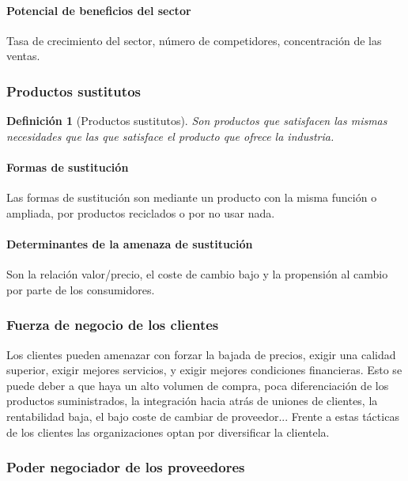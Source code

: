 \documentclass[12pt]{article}
\theoremstyle{definition_wo_parentheses}
\newtheorem{definicion}{Definición}[section]
\begin{document}
\paragraph{Potencial de beneficios del sector} Tasa de crecimiento del sector, número de competidores, concentración de las ventas.

\subsubsection{Productos sustitutos}

\begin{definicion}[Productos sustitutos]
Son productos que satisfacen las mismas necesidades que las que satisface el producto que ofrece la industria.
\end{definicion}

\paragraph{Formas de sustitución} Las formas de sustitución son mediante un producto con la misma función o ampliada, por productos reciclados o por no usar nada.

\paragraph{Determinantes de la amenaza de sustitución} Son la relación valor/precio, el coste de cambio bajo y la propensión al cambio por parte de los consumidores.

\subsubsection{Fuerza de negocio de los clientes}

Los clientes pueden amenazar con forzar la bajada de precios, exigir una calidad superior, exigir mejores servicios, y exigir mejores condiciones financieras. Esto se puede deber a que haya un alto volumen de compra, poca diferenciación de los productos suministrados, la integración hacia atrás de uniones de clientes, la rentabilidad baja, el bajo coste de cambiar de proveedor... Frente a estas tácticas de los clientes las organizaciones optan por diversificar la clientela.

\subsubsection{Poder negociador de los proveedores}
\end{document}
